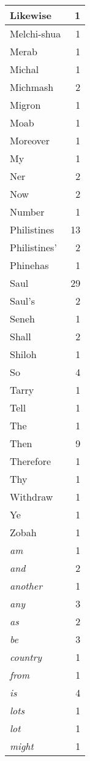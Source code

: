 \begin{center}
\begin{longtable}{l|r}
Likewise & 1 \\ \hline
Melchi-shua & 1 \\ \hline
Merab & 1 \\ \hline
Michal & 1 \\ \hline
Michmash & 2 \\ \hline
Migron & 1 \\ \hline
Moab & 1 \\ \hline
Moreover & 1 \\ \hline
My & 1 \\ \hline
Ner & 2 \\ \hline
Now & 2 \\ \hline
Number & 1 \\ \hline
Philistines & 13 \\ \hline
Philistines' & 2 \\ \hline
Phinehas & 1 \\ \hline
Saul & 29 \\ \hline
Saul's & 2 \\ \hline
Seneh & 1 \\ \hline
Shall & 2 \\ \hline
Shiloh & 1 \\ \hline
So & 4 \\ \hline
Tarry & 1 \\ \hline
Tell & 1 \\ \hline
The & 1 \\ \hline
Then & 9 \\ \hline
Therefore & 1 \\ \hline
Thy & 1 \\ \hline
Withdraw & 1 \\ \hline
Ye & 1 \\ \hline
Zobah & 1 \\ \hline
\emph{am} & 1 \\ \hline
\emph{and} & 2 \\ \hline
\emph{another} & 1 \\ \hline
\emph{any} & 3 \\ \hline
\emph{as} & 2 \\ \hline
\emph{be} & 3 \\ \hline
\emph{country} & 1 \\ \hline
\emph{from} & 1 \\ \hline
\emph{is} & 4 \\ \hline
\emph{lots} & 1 \\ \hline
\emph{lot} & 1 \\ \hline
\emph{might} & 1 \\ \hline

\end{longtable}
\end{center}
